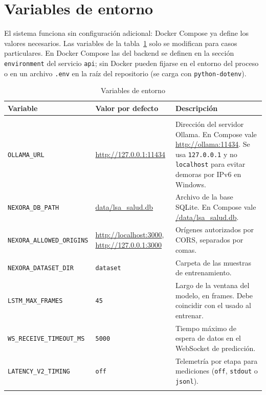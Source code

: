 \section{Variables de entorno}

El sistema funciona sin configuración adicional: Docker Compose ya define los valores necesarios. Las variables de la tabla~\ref{tab:variables} solo se modifican para casos particulares. En Docker Compose las del backend se definen en la sección \texttt{environment} del servicio \texttt{api}; sin Docker pueden fijarse en el entorno del proceso o en un archivo \texttt{.env} en la raíz del repositorio (se carga con \texttt{python-dotenv}).

\begin{table}[H]
  \centering
  \caption{Variables de entorno}\label{tab:variables}
  \small
  \begin{tabularx}{\textwidth}{>{\raggedright\arraybackslash}p{4.3cm} >{\raggedright\arraybackslash}p{3.4cm} X}
    \toprule
    \textbf{Variable} & \textbf{Valor por defecto} & \textbf{Descripción} \\
    \midrule
    \multicolumn{3}{@{}l}{\textit{Backend}} \\
    \texttt{OLLAMA\_URL} & \url{http://127.0.0.1:11434} & Dirección del servidor Ollama. En Compose vale \url{http://ollama:11434}. Se usa \texttt{127.0.0.1} y no \texttt{localhost} para evitar demoras por IPv6 en Windows. \\
    \texttt{NEXORA\_DB\_PATH} & \url{data/lsa_salud.db} & Archivo de la base SQLite. En Compose vale \url{/data/lsa_salud.db}. \\
    \texttt{NEXORA\_\allowbreak ALLOWED\_\allowbreak ORIGINS} & \url{http://localhost:3000}, \url{http://127.0.0.1:3000} & Orígenes autorizados por CORS, separados por comas. \\
    \texttt{NEXORA\_\allowbreak DATASET\_\allowbreak DIR} & \texttt{dataset} & Carpeta de las muestras de entrenamiento. \\
    \texttt{LSTM\_MAX\_FRAMES} & \texttt{45} & Largo de la ventana del modelo, en frames. Debe coincidir con el usado al entrenar. \\
    \texttt{WS\_RECEIVE\_\allowbreak TIMEOUT\_MS} & \texttt{5000} & Tiempo máximo de espera de datos en el WebSocket de predicción. \\
    \texttt{LATENCY\_V2\_\allowbreak TIMING} & \texttt{off} & Telemetría por etapa para mediciones (\texttt{off}, \texttt{stdout} o \texttt{jsonl}). \\
    \multicolumn{3}{@{}l}{\textit{Frontend}} \\

\end{tabularx}
\end{table}
